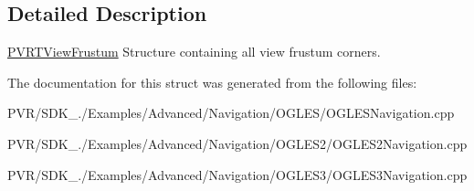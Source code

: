 \subsection{Detailed Description}


  \hyperlink{struct_p_v_r_t_view_frustum}{P\+V\+R\+T\+View\+Frustum}  Structure containing all view frustum corners. 

The documentation for this struct was generated from the following files\+:\begin{DoxyCompactItemize}
\item 
P\+V\+R/\+S\+D\+K\+\_./\+Examples/\+Advanced/\+Navigation/\+O\+G\+L\+E\+S/O\+G\+L\+E\+S\+Navigation.\+cpp\item 
P\+V\+R/\+S\+D\+K\+\_./\+Examples/\+Advanced/\+Navigation/\+O\+G\+L\+E\+S2/O\+G\+L\+E\+S2\+Navigation.\+cpp\item 
P\+V\+R/\+S\+D\+K\+\_./\+Examples/\+Advanced/\+Navigation/\+O\+G\+L\+E\+S3/O\+G\+L\+E\+S3\+Navigation.\+cpp\end{DoxyCompactItemize}
